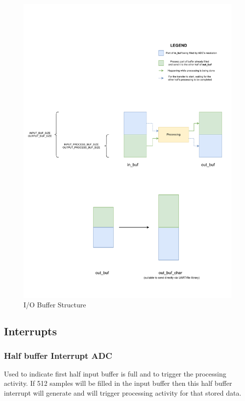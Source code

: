 \documentclass[11pt]{article}
\begin{document}
\begin{figure}[H]
    \centering
    \includegraphics[width=1\textwidth, trim={0cm 1cm 0cm 4cm}, clip]{IO_Buffer_Structure.pdf}
    \caption{I/O Buffer Structure}
    \end{figure}

\subsection{Interrupts}
\label{sec:org5278ae5}
\subsubsection*{Half buffer Interrupt ADC}
\label{sec:org165f908}
Used to indicate first half input buffer is full and to trigger the processing activity. If 512 samples will be filled in the input buffer then this half buffer interrupt will generate and will trigger processing activity for that stored data.
\end{document}
